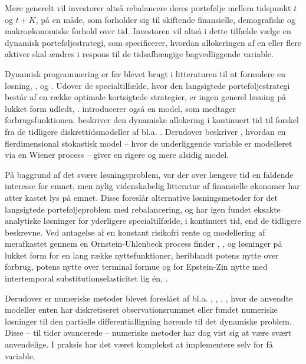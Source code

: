 \documentclass[
  a4paper,
  oneside]{memoir}
\begin{document}
Mere generelt vil investorer altså rebalancere deres portefølje mellem tidspunkt \(t\) og \(t+K\), på en måde, som forholder sig til skiftende finansielle, demografiske og makroøkonomiske forhold over tid. Investoren vil altså i dette tilfælde vælge en dynamisk porteføljestrategi, som specificerer, hvordan allokeringen af en eller flere aktiver skal ændres i respons til de tidsafhængige bagvedliggende variable.

Dynamisk programmering er før blevet brugt i litteraturen til at formulere en løsning, \citep{Mossin1968}, \citep{Samuelson1969} og \citep{Merton1969, Merton1971, Merton1973}. Udover de specialtilfælde, hvor den langsigtede porteføljestrategi består af en række optimale kortsigtede strategier, er ingen generel løsning på lukket form udledt, \citep{JurVic2011}. \citep{Samuelson1969} introducerer også en model, som medtager forbrugsfunktionen. \citep{Merton1969} beskriver den dynamiske allokering i kontinuert tid til forskel fra de tidligere diskrettidsmodeller af bl.a. \citep{Samuelson1969}. Derudover beskriver \citep{Merton1969}, hvordan en flerdimensional stokastisk model -- hvor de underliggende variable er modelleret via en Wiener process -- giver en rigere og mere alsidig model.

På baggrund af det svære løsningsproblem, var der over længere tid en faldende interesse for emnet, men nylig videnskabelig litteratur af finansielle økonomer har atter kastet lys på emnet. Disse foreslår alternative løsningsmetoder for det langsigtede porteføljeproblem med rebalancering, og har igen fundet eksakte analytiske løsninger for yderligere specialtilfælde, i kontinuert tid, end de tidligere beskrevne. Ved antagelse af en konstant risikofri rente og modellering af merafkastet gennem en Ornstein-Uhlenbeck process finder \citep{BrenXia2002}, \citep{CampVic1999}, \citep{KimOm1996} og \citep{Wachter2002} løsninger på lukket form for en lang række nyttefunktioner, heriblandt potens nytte over forbrug, potens nytte over terminal formue og for Epstein-Zin nytte med intertemporal substitutionselasticitet lig én, \citep{CampVic2003}.

Derudover er numeriske metoder blevet foreslået af bl.a. \citep{BalLyn1999}, \citep{Lyn2001}, \citep{Bar2000}, \citep{BrenSchLag1997, BrenSchLag1999}, hvor de anvendte modeller enten har diskretiseret observationsrummet eller fundet numeriske løsninger til den partielle differentialligning hørende til det dynamiske problem. Disse -- til tider avancerede -- numeriske metoder har dog vist sig at være svært anvendelige. I praksis har det været komplekst at implementere selv for få variable.
\end{document}
